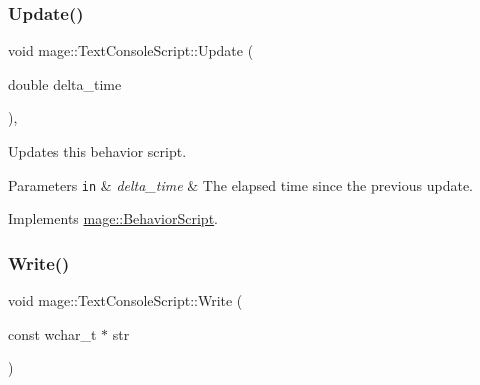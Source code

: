 \hypertarget{classmage_1_1_text_console_script_a7b1acbf48376b650c08fa941a63ffa98}{}\label{classmage_1_1_text_console_script_a7b1acbf48376b650c08fa941a63ffa98} 
\subsubsection{\texorpdfstring{Update()}{Update()}}
{\footnotesize\ttfamily void mage\+::\+Text\+Console\+Script\+::\+Update (\begin{DoxyParamCaption}\item[{double}]{delta\+\_\+time }\end{DoxyParamCaption})\hspace{0.3cm}{\ttfamily [override]}, {\ttfamily [virtual]}}

Updates this behavior script.


\begin{DoxyParams}[1]{Parameters}
\mbox{\tt in}  & {\em delta\+\_\+time} & The elapsed time since the previous update. \\
\hline
\end{DoxyParams}


Implements \hyperlink{classmage_1_1_behavior_script_a905b6c83640cb91d19fecab3435f6feb}{mage\+::\+Behavior\+Script}.

\hypertarget{classmage_1_1_text_console_script_a659586a498f8ff0f55aa2a3f25f0828b}{}\label{classmage_1_1_text_console_script_a659586a498f8ff0f55aa2a3f25f0828b} 
\subsubsection{\texorpdfstring{Write()}{Write()}}
{\footnotesize\ttfamily void mage\+::\+Text\+Console\+Script\+::\+Write (\begin{DoxyParamCaption}\item[{const wchar\+\_\+t $\ast$}]{str }\end{DoxyParamCaption})}

\hypertarget{classmage_1_1_text_console_script_a24fe33795c69e70d07a680826cfafcc1}{}\label{classmage_1_1_text_console_script_a24fe33795c69e70d07a680826cfafcc1} 
